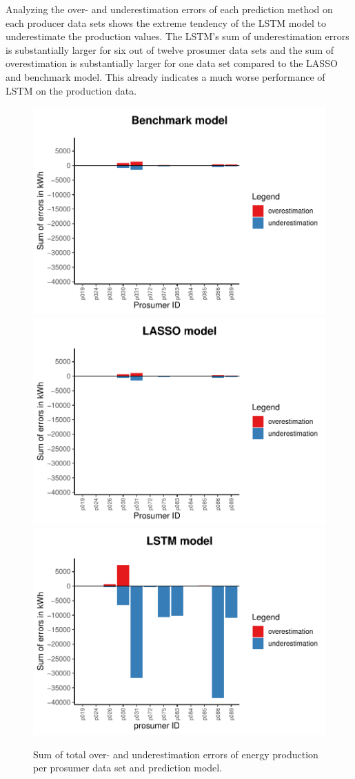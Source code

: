 Analyzing the over- and underestimation errors of each prediction method on each producer data sets shows the extreme tendency of the LSTM model to underestimate the production values. The LSTM's sum of underestimation errors is substantially larger for six out of twelve prosumer data sets and the sum of overestimation is substantially larger for one data set compared to the LASSO and benchmark model. This already indicates a much worse performance of LSTM on the production data.
%
\begin{figure}
    \centering
    \includegraphics[width=.5\textwidth]{thesis/graphs/evaluation/p_barplot_naive_overunderestimation.pdf}\\\vspace{.6cm}
    \includegraphics[width=.5\textwidth]{thesis/graphs/evaluation/p_barplot_LASSO_overunderestimation.pdf}\\\vspace{.6cm}
    \includegraphics[width=.5\textwidth]{thesis/graphs/evaluation/p_barplot_LSTM_overunderestimation.pdf}
    \caption[Sum of total over- and underestimation errors per prosumer data set]{Sum of total over- and underestimation errors of energy production per prosumer data set and prediction model. \quantnet\href{}{}}
    \label{Fig:overunderestimation_p}
\end{figure}
%


